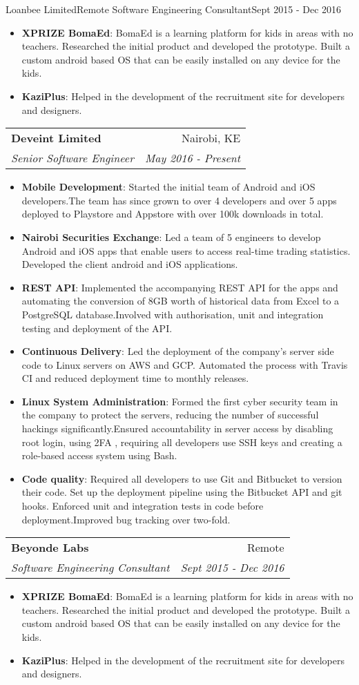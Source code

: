 \documentclass[letterpaper,11pt]{article}
\makeatletter
\newcommand{\resumeItem}[2]{
  \item\small{
    \textbf{#1}{: #2 \vspace{-2pt}}
  }
}
\newcommand{\resumeSubheading}[4]{
  \vspace{-1pt}\item
    \begin{tabular*}{0.97\textwidth}{l@{\extracolsep{\fill}}r}
      \textbf{#1} & #2 \\
      \textit{\small#3} & \textit{\small #4} \\
    \end{tabular*}\vspace{-5pt}
}
\newcommand{\resumeItemListStart}{\begin{itemize}}
\newcommand{\resumeItemListEnd}{\end{itemize}\vspace{-5pt}}
\makeatother
\begin{document}
      {Loanbee Limited}{Remote}
      {Software Engineering Consultant}{Sept 2015 - Dec 2016}
      \resumeItemListStart
        \resumeItem{XPRIZE BomaEd}
          {BomaEd is a learning platform for kids in areas with no teachers. Researched the initial product and developed the prototype. Built a custom android based OS that can be easily installed on any device for the kids.}
        \resumeItem{KaziPlus}
          {Helped in the development of the recruitment site for developers and designers.}
      \resumeItemListEnd
\resumeSubheading
      {Deveint Limited}{Nairobi, KE}
      {Senior Software Engineer}{May 2016 - Present}
      \resumeItemListStart
      \resumeItem{Mobile Development}
          {Started the initial team of Android and iOS developers.The team has since grown to over 4 developers and over 5 apps deployed to Playstore and Appstore with over 100k downloads in total.}
        \resumeItem{Nairobi Securities Exchange}
          {Led a team of 5 engineers to develop Android and iOS apps that enable users to access real-time trading statistics. Developed the client android and iOS applications.}
        \resumeItem{REST API}
          {Implemented the accompanying REST API for the apps and automating the conversion of
8GB worth of historical data from Excel to a PostgreSQL database.Involved with authorisation, unit and integration testing and deployment of the API.}
        \resumeItem{Continuous Delivery}
          {Led the deployment of the company's server side code to Linux servers on AWS and GCP. Automated the process with Travis CI and reduced deployment time to monthly releases.}
        \resumeItem{Linux System Administration}
          {Formed the first cyber security team in the company to protect the servers, reducing
the number of successful hackings significantly.Ensured accountability in server access by disabling root login, using 2FA , requiring all
developers use SSH keys and creating a role-based access system using Bash.}
        \resumeItem{Code quality}
          {Required all developers to use Git and Bitbucket to version their code. Set up the deployment pipeline using the Bitbucket API and git hooks. Enforced unit and integration tests in code before deployment.Improved bug tracking over two-fold.}
      \resumeItemListEnd
      
    \resumeSubheading
      {Beyonde Labs}{Remote}
      {Software Engineering Consultant}{Sept 2015 - Dec 2016}
      \resumeItemListStart
        \resumeItem{XPRIZE BomaEd}
          {BomaEd is a learning platform for kids in areas with no teachers. Researched the initial product and developed the prototype. Built a custom android based OS that can be easily installed on any device for the kids.}
        \resumeItem{KaziPlus}
          {Helped in the development of the recruitment site for developers and designers.}
      \resumeItemListEnd
      
\end{document}
